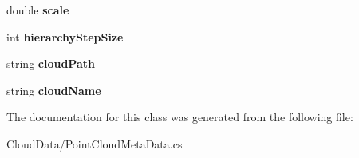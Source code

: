 \begin{DoxyCompactItemize}
double {\bfseries scale}
\item 
\mbox{\label{class_cloud_data_1_1_point_cloud_meta_data_a8d61903ad4dcd1ba3911f186f05ed52a}} 
int {\bfseries hierarchy\+Step\+Size}
\item 
\mbox{\label{class_cloud_data_1_1_point_cloud_meta_data_aab3f73c48181a9dc31ec03926af2da8a}} 
string {\bfseries cloud\+Path}
\item 
\mbox{\label{class_cloud_data_1_1_point_cloud_meta_data_a0c5632a8cf45f3ec60dabb7f9dd65864}} 
string {\bfseries cloud\+Name}
\end{DoxyCompactItemize}


The documentation for this class was generated from the following file\+:\begin{DoxyCompactItemize}
\item 
Cloud\+Data/Point\+Cloud\+Meta\+Data.\+cs\end{DoxyCompactItemize}
